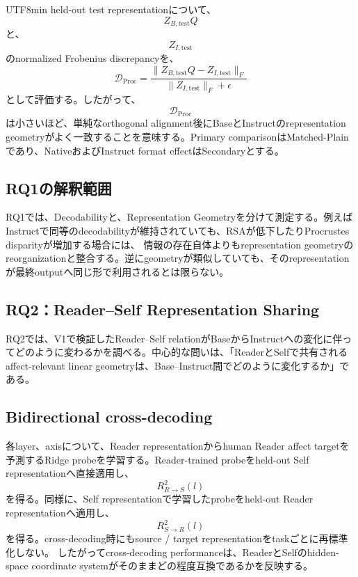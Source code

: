 \documentclass{article} %
\begin{document}
\begin{CJK*}{UTF8}{min}
held-out test representationについて、
\[
Z_{B,\mathrm{test}}Q
\]
と、
\[
Z_{I,\mathrm{test}}
\]
のnormalized Frobenius discrepancyを、
\[
\mathcal{D}_{\mathrm{Proc}}
=
\frac{
\|
Z_{B,\mathrm{test}}Q
-
Z_{I,\mathrm{test}}
\|_F
}{
\|
Z_{I,\mathrm{test}}
\|_F+\epsilon
}
\]
として評価する。したがって、
\[
\mathcal{D}_{\mathrm{Proc}}
\]
は小さいほど、単純なorthogonal alignment後にBaseとInstructのrepresentation geometryがよく一致することを意味する。Primary comparisonはMatched-Plainであり、NativeおよびInstruct format effectはSecondaryとする。


\subsection{RQ1の解釈範囲}

RQ1では、Decodabilityと、Representation Geometryを分けて測定する。例えばInstructで同等のdecodabilityが維持されていても、RSAが低下したりProcrustes disparityが増加する場合には、
情報の存在自体よりもrepresentation geometryのreorganizationと整合する。逆にgeometryが類似していても、そのrepresentationが最終outputへ同じ形で利用されるとは限らない。



\subsection{RQ2：Reader--Self Representation Sharing}
\label{app:v2-rq2}

RQ2では、V1で検証したReader--Self relationがBaseからInstructへの変化に伴ってどのように変わるかを調べる。中心的な問いは、「ReaderとSelfで共有されるaffect-relevant linear geometryは、Base--Instruct間でどのように変化するか」である。


\subsection{Bidirectional cross-decoding}

各layer、axisについて、Reader representationからhuman Reader affect targetを予測するRidge probeを学習する。Reader-trained probeをheld-out Self representationへ直接適用し、
\[
R^2_{R\rightarrow S}(l)
\]
を得る。同様に、Self representationで学習したprobeをheld-out Reader representationへ適用し、
\[
R^2_{S\rightarrow R}(l)
\]
を得る。cross-decoding時にもsource / target representationをtaskごとに再標準化しない。
したがってcross-decoding performanceは、ReaderとSelfのhidden-space coordinate systemがそのままどの程度互換であるかを反映する。



\end{CJK*}
\end{document}
